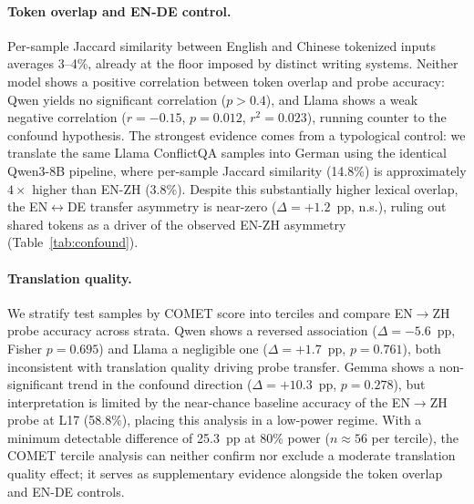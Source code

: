 \paragraph{Token overlap and EN-DE control.}
Per-sample Jaccard similarity between English and Chinese tokenized inputs averages 3--4\%, already at the floor imposed by distinct writing systems.
Neither model shows a positive correlation between token overlap and probe accuracy: Qwen yields no significant correlation ($p > 0.4$), and Llama shows a weak negative correlation ($r = -0.15$, $p = 0.012$, $r^2 = 0.023$), running counter to the confound hypothesis.
The strongest evidence comes from a typological control: we translate the same Llama ConflictQA samples into German using the identical Qwen3-8B pipeline, where per-sample Jaccard similarity (14.8\%) is approximately $4\times$ higher than EN-ZH (3.8\%).
Despite this substantially higher lexical overlap, the EN$\leftrightarrow$DE transfer asymmetry is near-zero ($\Delta = +1.2$~pp, n.s.), ruling out shared tokens as a driver of the observed EN-ZH asymmetry (Table~\ref{tab:confound}).

\paragraph{Translation quality.}
We stratify test samples by COMET score into terciles and compare EN$\to$ZH probe accuracy across strata.
Qwen shows a reversed association ($\Delta = -5.6$~pp, Fisher $p = 0.695$) and Llama a negligible one ($\Delta = +1.7$~pp, $p = 0.761$), both inconsistent with translation quality driving probe transfer.
Gemma shows a non-significant trend in the confound direction ($\Delta = +10.3$~pp, $p = 0.278$), but interpretation is limited by the near-chance baseline accuracy of the EN$\to$ZH probe at L17 (58.8\%), placing this analysis in a low-power regime.
With a minimum detectable difference of 25.3~pp at 80\% power ($n \approx 56$ per tercile), the COMET tercile analysis can neither confirm nor exclude a moderate translation quality effect; it serves as supplementary evidence alongside the token overlap and EN-DE controls.

\begin{table}[t]
\centering
\caption{Confound exclusion analysis. COMET tercile: $\Delta$ = balanced accuracy difference between high and low COMET score terciles for EN$\to$ZH probes (Fisher's exact test). Token overlap: Pearson correlation between per-sample Jaccard similarity and EN$\to$ZH probe accuracy.}
\label{tab:confound}
\end{table}


